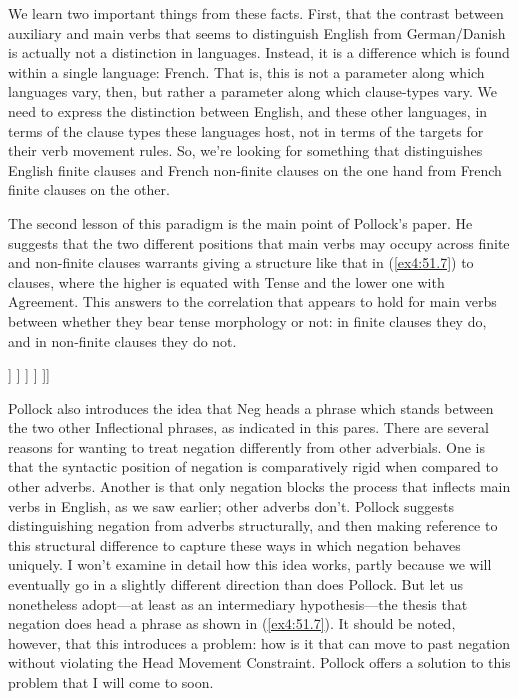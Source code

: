 We learn two important things from these facts. First, that the contrast between auxiliary and main verbs that seems to distinguish English from German/Danish is actually not a distinction in languages. Instead, it is a difference which is found within a single language: French. That is, this is not a parameter along which languages vary, then, but rather a parameter along which clause-types vary. We need to express the distinction between English, and these other languages, in terms of the clause types these languages host, not in terms of the targets for their verb movement rules. So, we're looking for something that distinguishes English finite clauses and French non-finite clauses on the one hand from French finite clauses on the other.

The second lesson of this paradigm is the main point of Pollock's paper. He suggests that the two different positions that main verbs may occupy across finite and non-finite clauses warrants giving a structure like that in (\ref{ex4:51.7}) to clauses, where the higher  is equated with Tense and the lower one with Agreement. This answers to the correlation that appears to hold for main verbs between whether they bear tense morphology or not: in finite clauses they do, and in non-finite clauses they do not.
\begin{exe}
\ex \label{ex4:51.7}
\small
\begin{forest}
[TP[\ibar{T}
	[\obar{T} ]
	[NegP [\ibar{Neg}
		[\obar{Neg} ]
		[AgrP [\ibar{Agr}
			[\obar{Agr} ]
			[VP ]
		] ]
	] ]
]]
\end{forest}
\end{exe}
Pollock also introduces the idea that Neg heads a phrase which stands between the two other Inflectional phrases, as indicated in this pares. There are several reasons for wanting to treat negation differently from other adverbials. One is that the syntactic position of negation is comparatively rigid when compared to other adverbs. Another is that only negation blocks the process that inflects main verbs in English, as we saw earlier; other adverbs don't. Pollock suggests distinguishing negation from adverbs structurally, and then making reference to this structural difference to capture these ways in which negation behaves uniquely. I won't examine in detail how this idea works, partly because we will eventually go in a slightly different direction than does Pollock. But let us nonetheless adopt---at least as an intermediary hypothesis---the thesis that negation does head a phrase as shown in (\ref{ex4:51.7}). It should be noted, however, that this introduces a problem: how is it that  can move to  past negation without violating the Head Movement Constraint. Pollock offers a solution to this problem that I will come to soon.

